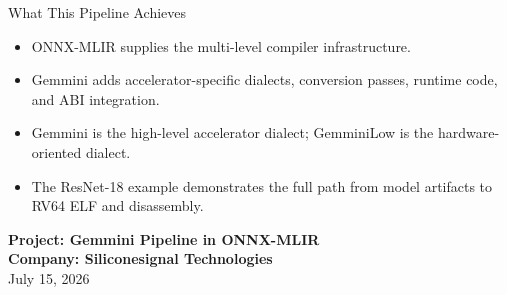 \documentclass[aspectratio=169,10pt]{beamer}
\begin{document}
\begin{frame}{What This Pipeline Achieves}
  \begin{itemize}
    \item ONNX-MLIR supplies the multi-level compiler infrastructure.
    \item Gemmini adds accelerator-specific dialects, conversion passes, runtime code, and ABI integration.
    \item Gemmini is the high-level accelerator dialect; GemminiLow is the hardware-oriented dialect.
    \item The ResNet-18 example demonstrates the full path from model artifacts to RV64 ELF and disassembly.
  \end{itemize}
  \vfill
  \begin{center}
    \textbf{Project: Gemmini Pipeline in ONNX-MLIR}\\
    \textbf{Company: Siliconesignal Technologies}\\
    July 15, 2026
  \end{center}
\end{frame}
\end{document}
